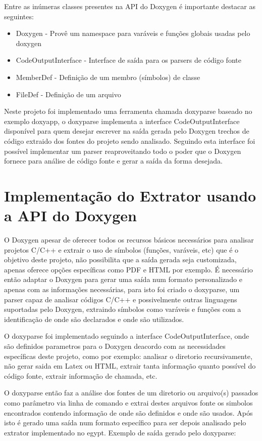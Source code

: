 Entre as inúmeras classes presentes na API do Doxygen é importante destacar as
seguintes:

\begin{itemize}
\item Doxygen - Provê um namespace para varáveis e funções globais usadas pelo
doxygen
\item CodeOutputInterface - Interface de saída para os parsers de código fonte
\item MemberDef - Definição de um membro (símbolos) de classe
\item FileDef - Definição de um arquivo
\end{itemize}

Neste projeto foi implementado uma ferramenta chamada doxyparse baseado no
exemplo doxyapp, o doxyparse implementa a interface CodeOutputInterface disponível para
quem desejar escrever na saída gerada pelo Doxygen trechos de código extraido
dos fontes do projeto sendo analisado. Seguindo esta interface foi possível implementar um
parser reaproveitando todo o poder que o Doxygen fornece para análise de código
fonte e gerar a saída da forma desejada.

\section{Implementação do Extrator usando a API do Doxygen}

O Doxygen apesar de oferecer todos os recursos básicos necessários para
analisar projetos C/C++ e extrair o uso de símbolos (funções, varáveis, etc)
que é o objetivo deste projeto, não possibilita que a saída gerada seja
customizada, apenas oferece opções específicas como PDF e HTML por exemplo. É
necessário então adaptar o Doxygen para gerar uma saída num formato
personalizado e apenas com as informações necessárias, para isto foi criado o
doxyparse, um parser capaz de analisar códigos C/C++ e possivelmente outras
linguagens suportadas pelo Doxygen, extraindo símbolos como varáveis e funções
com a identificação de onde são declarados e onde são utilizados.

O doxyparse foi implementado seguindo a interface CodeOutputInterface, onde são
definidos parametros para o Doxygen deacordo com as necessidades específicas
deste projeto, como por exemplo: analisar o diretorio recursivamente, não gerar
saida em Latex ou HTML, extrair tanta informação quanto possível do código
fonte, extrair informação de chamada, etc.

O doxyparse então faz a análise dos fontes de um diretorio ou arquivo(s)
passados como parâmetro via linha de comando e extrai destes arquivos fonte os
simbolos encontrados contendo informação de onde são definidos e onde são
usados. Após isto é gerado uma saída num formato específico para ser depois
analisado pelo extrator implementado no egypt. Exemplo de saída gerado pelo
doxyparse:

